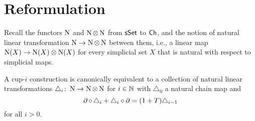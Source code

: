 
\section{Reformulation} \label{s:reformulation}

Recall the functors $\operatorname{N}$ and $\operatorname{N} \otimes \operatorname{N}$ from $\mathsf{sSet}$ to $\mathsf{Ch}$, and the notion of natural linear transformation $\operatorname{N} \to \operatorname{N} \otimes \operatorname{N}$ between them, i.e., a linear map $\operatorname{N}(X) \to \operatorname{N}(X) \otimes \operatorname{N}(X)$ for every simplicial set $X$ that is natural with respect to simplicial maps.


\begin{lemma} \label{l:cup-i construction coalgebra}
	A cup-$i$ construction is canonically equivalent to a collection of natural linear transformations $\triangle_i \colon \operatorname{N} \to \operatorname{N} \otimes \operatorname{N}$ for $i \in \mathbb{N}$ with $\triangle_0$ a natural chain map and
	\[
	\operatorname{\partial} \circ \, \triangle_i + \triangle_i \circ \operatorname{\partial} =
	(1+T) \triangle_{i-1}
	\]
	for all $i > 0$.
\end{lemma}



